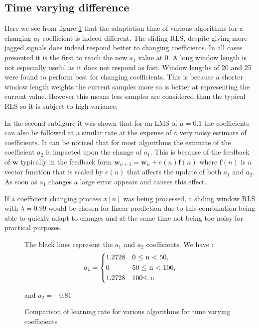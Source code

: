 \documentclass[10pt,twoside,a4paper]{report}
\begin{document}
\FloatBarrier
\subsection{Time varying difference}

Here we see from figure \ref{fig:3_2e} that the adaptation time of various algorithms for a changing $a_1$ coefficient is indeed different. The sliding RLS, despite giving more jagged signals does indeed respond better to changing coefficients. In all cases presented it is the first to reach the new $a_1$ value at 0. A long window length is not especially useful as it does not respond as fast. Window lengths of 20 and 25 were found to perform best for changing coefficients. This is because a shorter window length weights the current samples more so is better at representing the current value. However this means less samples are considered than the typical RLS so it is subject to high variance.


In the second subfigure it was shown that for an LMS of $\mu=0.1$ the coefficients can also be followed at a similar rate at the expense of a very noisy estimate of coefficients. It can be noticed that for most algorithms the estimate of the coefficient $a_2$ is impacted upon the change of $a_1$. This is because of the feedback of $\mathbf{w}$ typically in the feedback form $\mathbf{w}_{n+1}=\mathbf{w}_{n}+e(n)\mathbf{f}(n)$ where $\mathbf{f}(n)$ is a vector function that is scaled by $e(n)$ that affects the update of both $a_1$ and $a_2$. As soon as $a_1$ changes a large error appears and causes this effect.

If a coefficient changing process $x[n]$ was being processed, a sliding window RLS with $\lambda=0.99$ would be chosen for linear prediction due to this combination being able to quickly adapt to changes and at the same time not being too noisy for practical purposes.
\begin{figure}[h!]
\centering
\resizebox{\textwidth}{!}{}
\resizebox{\textwidth}{!}{}
The black lines represent the $a_1$ and $a_2$ coefficients.
We have :
\begin{equation*}
a_1 = \begin{dcases*}
        1.2728  & 0 $\leq$ n $<$ 50,\\
        0  & 50 $\leq$ n $<$ 100,\\
        1.2728  & 100$\leq$ n \\
        \end{dcases*}
\end{equation*} 

and $a_2 = -0.81$
\caption{Comparison of learning rate for various algorithms for time varying coefficients}
\label{fig:3_2e}
\end{figure}
\end{document}
